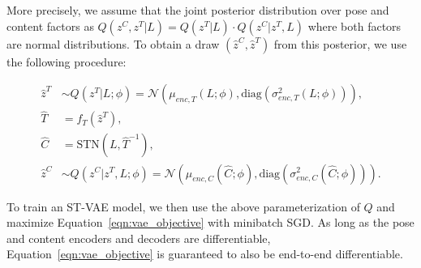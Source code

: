 More precisely, we assume that the joint posterior distribution over
pose and content factors as
$Q(z^C, z^T | L) = Q(z^T |L)\cdot Q(z^C | z^T, L)$ where both factors are normal distributions.  
To obtain a draw $(\hat{z}^C, \hat{z}^T)$ from this posterior, we use the following procedure:

\begin{align*}
\hat{z}^T &\sim Q(z^T |L; \phi) = \mathcal{N}(\mu_{enc,T}(L; \phi), \mbox{diag}(\sigma_{enc,T}^2(L; \phi))), \\
\hat{T} &= f_T(\hat{z}^T), \\
\hat{C} &= \mbox{STN}(L, \hat{T}^{-1}), \\
\hat{z}^C &\sim Q(z^C | z^T, L; \phi) =  \mathcal{N}(\mu_{enc, C}(\hat{C}; \phi), \mbox{diag}(\sigma_{enc, C}^2(\hat{C}; \phi))).
\end{align*}


To train an ST-VAE model, we then use the above parameterization of $Q$ and maximize Equation~\ref{eqn:vae_objective} with minibatch
SGD.
As long as the pose and content encoders and decoders  are differentiable, Equation~\ref{eqn:vae_objective} is guaranteed to also be 
end-to-end differentiable.






